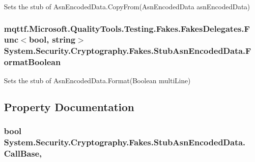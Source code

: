 Sets the stub of Asn\-Encoded\-Data.\-Copy\-From(\-Asn\-Encoded\-Data asn\-Encoded\-Data)

\hypertarget{class_system_1_1_security_1_1_cryptography_1_1_fakes_1_1_stub_asn_encoded_data_ac2346d021a64d16b12726b93beff42ea}{
\subsubsection[{Format\-Boolean}]{\setlength{\rightskip}{0pt plus 5cm}mqttf.\-Microsoft.\-Quality\-Tools.\-Testing.\-Fakes.\-Fakes\-Delegates.\-Func$<$bool, string$>$ System.\-Security.\-Cryptography.\-Fakes.\-Stub\-Asn\-Encoded\-Data.\-Format\-Boolean}}\label{class_system_1_1_security_1_1_cryptography_1_1_fakes_1_1_stub_asn_encoded_data_ac2346d021a64d16b12726b93beff42ea}


Sets the stub of Asn\-Encoded\-Data.\-Format(\-Boolean multi\-Line)



\subsection{Property Documentation}
\hypertarget{class_system_1_1_security_1_1_cryptography_1_1_fakes_1_1_stub_asn_encoded_data_a69c42c98569744989cc4826970352406}{
\subsubsection[{Call\-Base}]{\setlength{\rightskip}{0pt plus 5cm}bool System.\-Security.\-Cryptography.\-Fakes.\-Stub\-Asn\-Encoded\-Data.\-Call\-Base\hspace{0.3cm}{\ttfamily [get]}, {\ttfamily [set]}}}\label{class_system_1_1_security_1_1_cryptography_1_1_fakes_1_1_stub_asn_encoded_data_a69c42c98569744989cc4826970352406}


